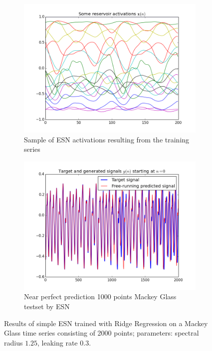 \begin{figure}[!ht]
    \centering
        \begin{subfigure}[b]{.45\textwidth}
        \centering
        \includegraphics[width=\textwidth]{./img/plots/esn/mg/resact.png}
        \caption{Sample of ESN activations resulting from the training series}
        \label{subfig:mg_act}
        \end{subfigure}
        \quad
        \begin{subfigure}[b]{.45\textwidth}
        \centering
        \includegraphics[width=\textwidth]{./img/plots/esn/mg/pred1000_br.png}
        \caption{Near perfect prediction 1000 points Mackey Glass testset by ESN}
        \label{subfig:mg_pred}
        \end{subfigure}
    \caption{Results of simple ESN trained with Ridge Regression on a Mackey Glass time series consisting of 2000 points; parameters: spectral radius $1.25$, leaking rate $0.3$.}
    \label{fig:mackeyglass}
\end{figure}


